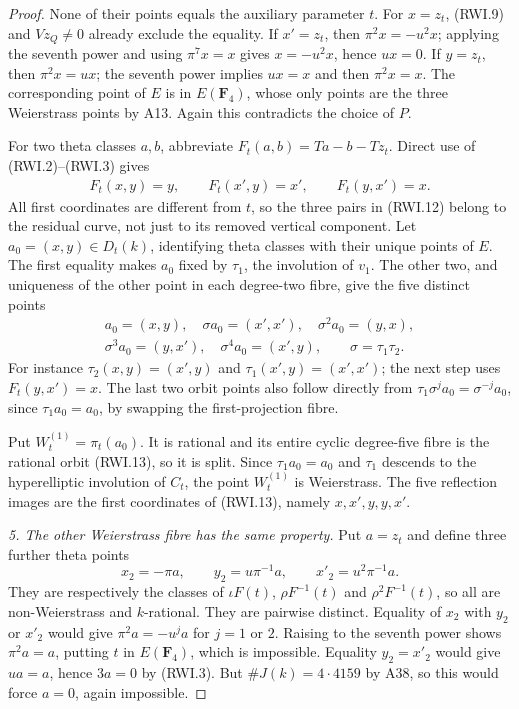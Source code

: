\begin{proof}
None of their points equals the auxiliary parameter
$t$. For $x=z_t$, (RWI.9) and $Vz_Q\ne0$ already
exclude the equality. If $x'=z_t$, then
$\pi^2x=-u^2x$; applying the seventh power and using
$\pi^7x=x$ gives $x=-u^2x$, hence $ux=0$.
If $y=z_t$, then $\pi^2x=ux$; the seventh power
implies $ux=x$ and then $\pi^2x=x$. The corresponding
point of $E$ is in $E(\mathbf F_4)$, whose only points
are the three Weierstrass points by A13. Again this
contradicts the choice of $P$.

For two theta classes $a,b$, abbreviate
$F_t(a,b)=Ta-b-Tz_t$. Direct use of (RWI.2)--(RWI.3)
gives
\[
 \begin{gathered}
 F_t(x,y)=y,\qquad F_t(x',y)=x',\qquad
 F_t(y,x')=x. 
 \end{gathered}
 \tag{RWI.12}
\]
All first coordinates are different from $t$, so the
three pairs in (RWI.12) belong to the residual curve,
not just to its removed vertical component. Let
$a_0=(x,y)\in D_t(k)$, identifying theta classes with
their unique points of $E$. The first equality makes
$a_0$ fixed by $\tau_1$, the involution of $v_1$.
The other two, and uniqueness of the other point in
each degree-two fibre, give the five distinct points
\[
 \begin{gathered}
 a_0=(x,y),\quad \sigma a_0=(x',x'),\quad
 \sigma^2a_0=(y,x),\\
 \sigma^3a_0=(y,x'),\quad\sigma^4a_0=(x',y),
             \qquad \sigma=\tau_1\tau_2.
 \end{gathered}
 \tag{RWI.13}
\]
For instance $\tau_2(x,y)=(x',y)$ and
$\tau_1(x',y)=(x',x')$; the next step uses $F_t(y,x')=x$.
The last two orbit points also follow directly from
$\tau_1\sigma^j a_0=\sigma^{-j}a_0$, since
$\tau_1a_0=a_0$, by swapping the first-projection fibre.

Put $W_t^{(1)}=\pi_t(a_0)$. It is rational and its entire
cyclic degree-five fibre is the rational orbit
(RWI.13), so it is split. Since $\tau_1a_0=a_0$
and $\tau_1$ descends to the hyperelliptic involution
of $C_t$, the point $W_t^{(1)}$ is Weierstrass.
The five reflection images are the first coordinates
of (RWI.13), namely $x,x',y,y,x'$.

\emph{5. The other Weierstrass fibre has the same property.}
Put $a=z_t$ and define three further theta points
\[
       x_2=-\pi a,\qquad y_2=u\pi^{-1}a,
                       \qquad x'_2=u^2\pi^{-1}a.
 \tag{RWI.14}
\]
They are respectively the classes of
$\iota F(t)$, $\rho F^{-1}(t)$ and
$\rho^2F^{-1}(t)$, so all are non-Weierstrass and
$k$-rational. They are pairwise distinct. Equality
of $x_2$ with $y_2$ or $x'_2$ would give
$\pi^2a=-u^j a$ for $j=1$ or $2$. Raising to the
seventh power shows $\pi^2a=a$, putting $t$ in
$E(\mathbf F_4)$, which is impossible. Equality
$y_2=x'_2$ would give $ua=a$, hence $3a=0$ by
(RWI.3). But $\#J(k)=4\cdot4159$ by A38, so this
would force $a=0$, again impossible.


\end{proof}
